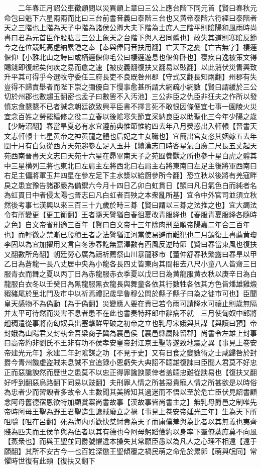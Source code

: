 　　二年春正月詔公車徵顗問以災異顗上章曰三公上應台階下同元首【賢曰春秋元命包曰魁下六星兩兩而比曰三台前書音義曰泰階三台也又黄帝泰階六符經曰泰階者天之三階也上階為天子中階為諸侯公卿大夫下階為士庶人三階平則隂陽和風雨時尚書曰君為元首臣作股肱言三公上象天之台階下與人君同體也】政失其道則寒隂反節今之在位競託高虛納累鍾之奉【奉與俸同音扶用翻】亡天下之憂【亡古無字】棲遲偃仰【小雅北山之詩曰或栖遲偃仰毛公曰棲遲遊息也偃仰卧也】寑疾自逸被策文得賜錢即復起矣何疾之易而愈之速【被皮義翻復扶又翻易以䜴翻】以此消伏災眚興致升平其可得乎今選牧守委任三府長吏不良既咎州郡【守式又翻長知兩翻】州郡有失豈得不歸責舉者而陛下崇之彌優自下慢事愈甚所謂大網疏小網數【賢曰謂緩於三公切於州郡也數趨玉翻密也孟子曰數罟不入汚池】三公非臣之仇臣非狂夫之作所以發憤忘食懇懇不已者誠念朝廷欲致興平臣書不擇言死不敢恨因條便宜七事一園陵火災宜念百姓之勞罷繕修之役二立春以後隂寒失節宜采納良臣以助聖化三今年少陽之歲【少詩沼翻】春當旱夏必有水宜遵前典惟節惟約四去年八月熒惑出入軒轅【晉書天文志軒轅十七星黄帝之神黄龍之體也后妃之主女職也】宜簡出宫女恣其姻嫁五去年閏十月有白氣從西方天苑趨參左足入玉井【續漢志曰時客星氣白廣二尺長五丈起天苑西南晉書天文志曰天苑十六星在昴畢南天子之苑囿餋獸之所也參十星白虎之體其中三星横列三將也東北曰左肩主左將西北曰右肩主右將東南曰左足主後將軍西南曰右足主偏將軍玉井四星在參左足下主水漿以給厨參所今翻】恐立秋以後將有羌寇畔戾之患宜豫告諸郡嚴為備禦六今月十四日乙卯白虹貫日【顗曰凡日氣色白而純者名為虹貫日中者侵太陽也晉志曰凡白虹者百殃之本衆亂所基】宜令中外官司並須立秋然後考事七漢興以來三百三十九歲於時三朞【賢曰謂以三朞之法推之也】宜大蠲法令有所變更【更工衡翻】王者隨天譬猶自春徂夏改青服絳也【春服青夏服絳各隨時之色】自文帝省刑適三百年【賢曰自文帝十三年除肉刑至順帝陽嘉二年合三百年也】而輕微之禁漸已殷積王者之法譬猶江河當使易避而難犯也二月顗復上書薦黄瓊李固以為宜加擢用又言自冬涉春訖無嘉澤數有西風反逆時節【賢曰春當東風也復扶又翻數所角翻】朝廷勞心廣為禱祈薦祭山川暴龍移市【董仲舒春秋繁露曰春旱以甲乙日為蒼龍一長八丈居中央為小龍各長四丈皆東向其間相去八尺小童八人皆齋三日服青衣而舞之夏以丙丁日為赤龍服赤衣季夏以戊巳日為黄龍服黄衣秋以庚辛日為白龍服白衣冬以壬癸日為黑龍服黑衣龍長與舞童各依其行數牲各依其方色皆燔雄雞煅豭豬尾於里北門及市中以祈焉禮記歲旱魯穆公問於縣子縣子曰為之徙市可也】臣聞皇天感物不為偽動【為于偽翻】災變應人要在責已若令雨可請降水可禳止則歲無隔并太平可待然而災害不息者患不在此也書奏特拜郎中辭病不就　三月使匈奴中郎將趙稠遣從事將南匈奴兵出塞擊鮮卑破之初帝之立也乳母宋娥與其謀【與讀曰預】帝封娥為山陽君又封執金吾梁商子冀為襄邑侯【襄邑縣屬陳留郡】尚書令左雄上封事曰高帝約非劉氏不王非有功不侯孝安皇帝封江京王聖等遂致地震之異【事見上卷安帝建光元年】永建二年封隂謀之功【不見于史】又有日食之變數術之士咸歸咎於封爵今青州饑虛盗賊未息誠不宜追録小恩虧失大典詔不聼雄復諫曰臣聞人君莫不好忠正而惡讒諛然而歷世之患莫不以忠正得罪讒諛蒙倖者盖聼忠難從諛易也【復扶又翻好呼到翻惡烏路翻下同易以豉翻】夫刑罪人情之所甚惡貴寵人情之所甚欲是以時俗為忠者少而習諛者多故令人主數聞其美稀知其過迷而不悟以至於危亡臣伏見詔書顧念阿母舊德宿恩欲特加顯賞案尚書故事【漢故事皆尚書主之】無乳母爵邑之制唯先帝時阿母王聖為野王君聖造生讒賊廢立之禍【事見上卷安帝延光三年】生為天下所咀嚼【咀在呂翻】死為海内所歡快桀紂貴為天子而庸僕羞與為比者以其無義也夷齊賤為匹夫而王侯争與為伍者以其有德也今阿母躬蹈儉約以身率下羣僚蒸庶莫不向風【蒸衆也】而與王聖並同爵號懼違本操失其常願臣愚以為凡人之心理不相遠【遠于願翻】其所不安古今一也百姓深懲王聖傾覆之禍民萌之命危於累卵【萌與氓同】常懼時世復有此類【復扶又翻下